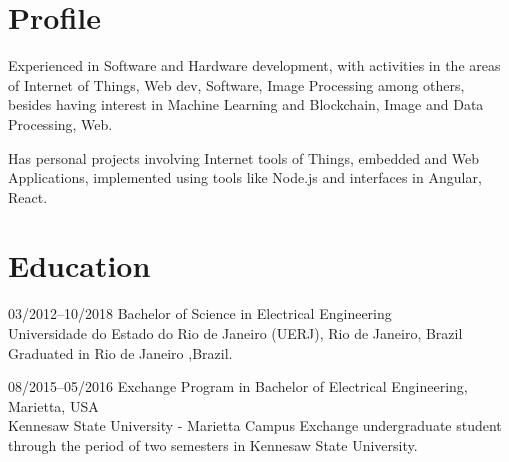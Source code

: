 \documentclass[]{friggeri-cv} %
\begin{document}
\section{Profile}

Experienced in Software and Hardware development, with activities in the areas of Internet of Things, Web dev, Software, Image Processing among others, besides having interest in Machine Learning and Blockchain, Image and Data Processing, Web.

Has personal projects involving Internet tools of Things, embedded and Web Applications, implemented using tools like Node.js and interfaces in Angular, React.


\section{Education}

\begin{entrylist}


\entry
{03/2012--10/2018}
{\hspace{.25cm} Bachelor of Science in Electrical Engineering}
{\\Universidade do Estado do Rio de Janeiro (UERJ), Rio de Janeiro, Brazil}
{Graduated  in Rio de Janeiro ,Brazil.  \\ \color{red}{CR = 7.8/10} }


\entry
{08/2015--05/2016}
{\hspace{.25cm} Exchange Program in Bachelor of Electrical Engineering, Marietta, USA}
{\\Kennesaw State University - Marietta Campus}
{Exchange undergraduate student through the period of two semesters in Kennesaw State University.  \\
\color{red}{GPA = 3.9/4.0} }


\end{entrylist}

\end{document}
